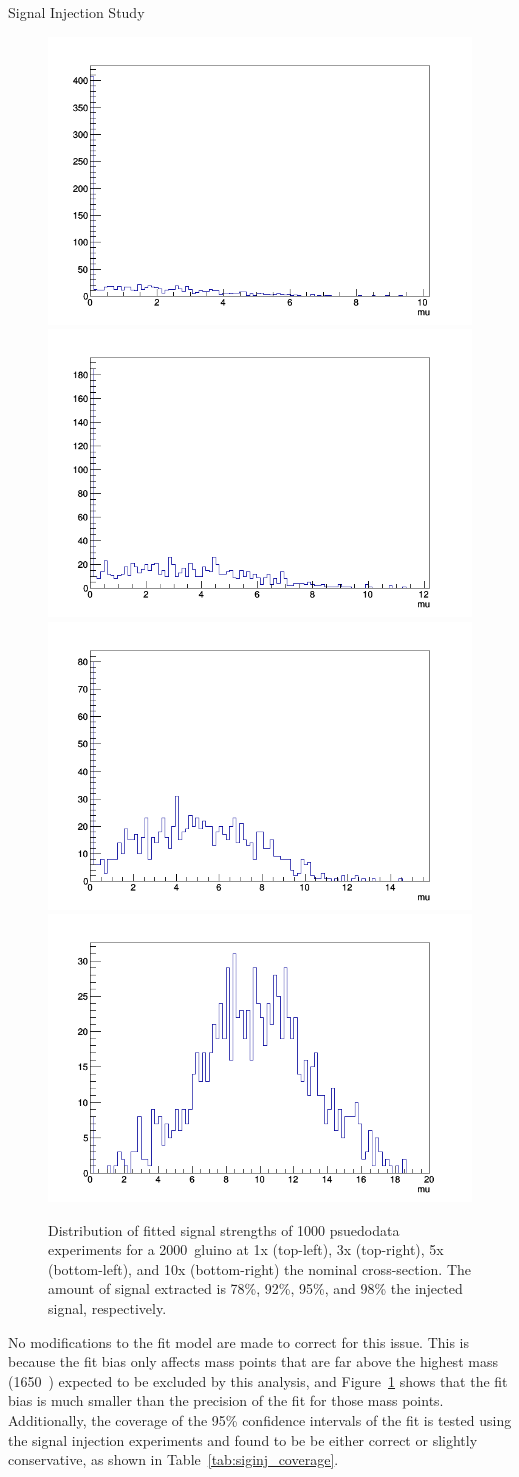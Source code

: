 \begin{section}{Signal Injection Study}
\begin{figure}[tbp!]
\centering
\includegraphics[angle=0,width=0.45\columnwidth]{fig/siginj_bias_1x.png}
\includegraphics[angle=0,width=0.45\columnwidth]{fig/siginj_bias_3x.png}
\includegraphics[angle=0,width=0.45\columnwidth]{fig/siginj_bias_5x.png}
\includegraphics[angle=0,width=0.45\columnwidth]{fig/siginj_bias_10x.png}
\caption{Distribution of fitted signal strengths of 1000 psuedodata experiments for a 2000~\GeV gluino at 1x (top-left), 3x (top-right), 5x (bottom-left), and 10x (bottom-right) the nominal cross-section.
The amount of signal extracted is 78\%, 92\%, 95\%, and 98\% the injected signal, respectively.}
\label{fig:sig_injection}
\end{figure}

No modifications to the fit model are made to correct for this issue.
This is because the fit bias only affects mass points that are far above the highest mass (1650~\GeV) expected to be excluded by this analysis, and Figure~\ref{fig:sig_injection} shows that the fit bias is much smaller than the precision of the fit for those mass points.
Additionally, the coverage of the 95\% confidence intervals of the fit is tested using the signal injection experiments and found to be be either correct or slightly conservative, as shown in Table~\ref{tab:siginj_coverage}.


\end{section}

